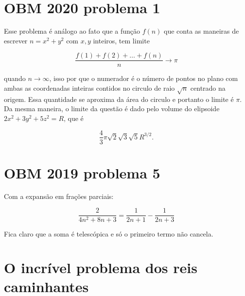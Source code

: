 \section{OBM 2020 problema 1}

Esse problema é análogo ao fato que a função $f(n)$ que conta as maneiras de escrever $n=x^2+y^2$ com $x,y$ inteiros, tem limite

$$\frac{f(1)+f(2)+\dots+f(n)}{n}\to\pi$$

quando $n\to\infty$, isso por que o numerador é o número de pontos no plano com ambas as coordenadas inteiras contidos no circulo de raio $\sqrt{n}$ centrado na origem. Essa quantidade se aproxima da área do circulo e portanto o limite é $\pi$. Da mesma maneira, o limite da questão é dado pelo volume do elipsoide $2x^2+3y^2+5z^2=R$, que é

$$\frac{4}{3}\pi\sqrt{2}\sqrt{3}\sqrt{5}R^{3/2}.$$

\section{OBM 2019 problema 5}

Com a expansão em frações parciais:

$$\frac{2}{4n^2+8n+3}=\frac{1}{2n+1}-\frac{1}{2n+3}$$

Fica claro que a soma é telescópica e só o primeiro termo não cancela.

\section{O incrível problema dos reis caminhantes}

